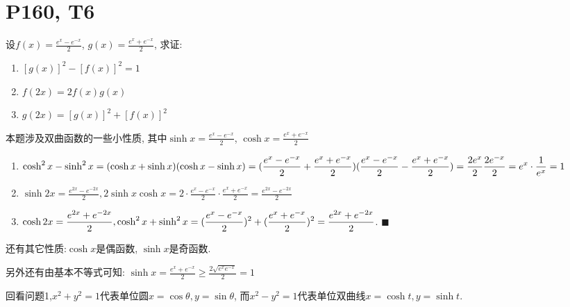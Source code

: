 \documentclass{book}
\begin{document}
    \section{\textcolor[rgb]{0.11,0.65,0.52}{P160, T6}}
    \begin{boxB}
        设$\displaystyle f(x)=\frac{e^x-e^{-x}}{2}$, $\displaystyle g(x)=\frac{e^x+e^{-x}}{2}$, 求证:\par
        \begin{enumerate}
            \item $[g(x)]^2-[f(x)]^2=1$
            \item $f(2x)=2f(x)g(x)$
            \item $g(2x)=[g(x)]^2+[f(x)]^2$
        \end{enumerate}
    \end{boxB}
    本题涉及\textcolor[rgb]{0.38,0.11,0.2}{双曲函数}的一些小性质, 其中$\displaystyle \sinh x = \frac{e^x-e^{-x}}{2}$, $\displaystyle \cosh x = \frac{e^x+e^{-x}}{2}$
    \begin{enumerate}
        \item $\displaystyle \cosh^2 x-\sinh^2x=(\cosh x+\sinh x)(\cosh x-\sinh x)\\=(\frac{e^x-e^{-x}}{2}+\frac{e^x+e^{-x}}{2})(\frac{e^x-e^{-x}}{2}-\frac{e^x+e^{-x}}{2})=\frac{2e^x}{2}\frac{2e^{-x}}{2}=e^x\cdot \frac{1}{e^x}=1$
        \item $\displaystyle \sinh 2x=\frac{e^{2x}-e^{-2x}}{2}, 2\sinh x \cosh x=2\cdot \frac{e^x-e^{-x}}{2}\cdot \frac{e^x+e^{-x}}{2}=\frac{e^{2x}-e^{-2x}}{2}$
        \item $\displaystyle \cosh 2x=\frac{e^{2x}+e^{-2x}}{2}, \cosh^2x+\sinh^2x=(\frac{e^x-e^{-x}}{2})^2+ (\frac{e^x+e^{-x}}{2})^2\\=\frac{e^{2x}+e^{-2x}}{2}$. $\blacksquare$
    \end{enumerate}

    还有其它性质:$\cosh x$是偶函数, $\sinh x$是奇函数.

    另外还有由\textcolor[rgb]{0.75,0.17,0.22}{基本不等式}可知: $\displaystyle \sinh x=\frac{e^x+e^{-x}}{2} \ge \frac{2\sqrt{e^xe^{-x}}}{2}=1$

    \textcolor[rgb]{0.38,0.11,0.2}{回看问题1,$x^2+y^2=1$代表单位圆$x=\cos \theta, y=\sin \theta$, 而$x^2-y^2=1$代表单位双曲线$x=\cosh t, y=\sinh t$.}
\end{document}
